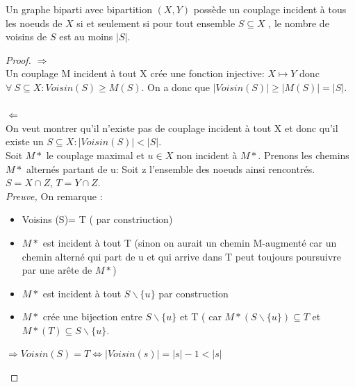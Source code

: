 \begin{mytheo} 
  Un graphe biparti avec bipartition $(X , Y)$ possède un couplage incident à tous les noeuds de $X$ si et seulement si pour tout ensemble $S \subseteq X$ , le nombre de voisins de $S$ est au moins $|S|$.
  \begin{proof}
    \noindent
    \newline
    $\Longrightarrow$\\
    Un couplage M incident à tout X crée une fonction injective: $X\mapsto Y$ donc $\forall\ S \subseteq X: Voisin (S) \geq M(S) $. On a donc que $ |Voisin (S)| \geq |M(S)| = |S| $.\\
    \\
    $\Longleftarrow$\\
    On veut montrer qu'il n'existe pas de couplage incident à tout X et donc qu'il existe un $ S \subseteq X: |Voisin (S)| < |S|$. \\
    Soit $M*$ le couplage maximal et $ u \in X$ non incident à $M*$. Prenons les chemins $M*$ alternés partant de u: Soit z l'ensemble des noeuds ainsi rencontrés. $ S = X\cap Z$, $T= Y \cap Z$.\\
    \textit{Preuve,} On remarque : 
    \begin{itemize}
      \item Voisins (S)= T ( par constriuction)
      \item	$M*$ est incident à tout T (sinon on aurait un chemin M-augmenté car un chemin alterné qui part de u et qui arrive dans T peut toujours poursuivre par une arête de $M*$)
      \item $M*$ est incident à tout $S\backslash\lbrace u\rbrace$ par construction
      \item $M*$ crée une bijection entre $S\backslash\lbrace u\rbrace$ et T ( car $M* (S\backslash\lbrace u\rbrace) \subseteq T$ et $M*(T) \subseteq S\backslash\lbrace u\rbrace$.
    \end{itemize}
     $ \Rightarrow  Voisin (S)= T \Longleftrightarrow  |Voisin(s)| = |s|-1 < |s|$

\begin{center}
\end{center}
\end{proof}
\end{mytheo}
